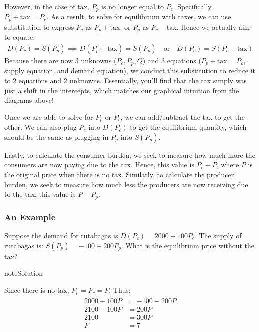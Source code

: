 \documentclass[letterpaper,10pt,english]{jupyterBook}
\begin{document}
\sphinxAtStartPar
However, in the case of tax, \(P_p\) is no longer equal to \(P_c\). Specifically, \(P_p+\text{tax}=P_c\). As a result, to solve for equilibrium with taxes, we can use substitution to express \(P_c\) as \(P_p+\text{tax}\), or \(P_p\) as \(P_c−\text{tax}\). Hence we actually aim to equate:
\begin{equation*}
\begin{split}D(P_c)=S(P_p)\implies D(P_p+\text{tax})=S(P_p)\quad \text{or} \quad D(P_c)=S(P_c−\text{tax})\end{split}
\end{equation*}
\sphinxAtStartPar
Because there are now 3 unknowns (\(P_c,P_p,Q\)) and 3 equations (\(P_p+\text{tax}=P_c\), supply equation, and demand equation), we conduct this substitution to reduce it to 2 equations and 2 unknowns. Essentially, you’ll find that the tax simply was just a shift in the intercepts, which matches our graphical intuition from the diagrams above!

\sphinxAtStartPar
Once we are able to solve for \(P_p\) or \(P_c\), we can add/subtract the tax to get the other. We can also plug \(P_c\) into \(D(P_c)\) to get the equilibrium quantity, which should be the same as plugging in \(P_p\) into \(S(P_p)\).

\sphinxAtStartPar
Lastly, to calculate the consumer burden, we seek to measure how much more the consumers are now paying due to the tax. Hence, this value is \(P_c−P\), where \(P\) is the original price when there is no tax. Similarly, to calculate the producer burden, we seek to measure how much less the producers are now receiving due to the tax; this value is \(P−P_p\).


\subsubsection{An Example}
\label{\detokenize{content/03-public/taxes-subsidies:an-example}}
\sphinxAtStartPar
{} Suppose the demand for rutabagas is \(D(P_c) = 2000 − 100P_c\). The supply of rutabagas is: \(S(P_p) = −100 + 200P_p\). What is the equilibrium price without the tax?

\begin{sphinxadmonition}{note}{Solution}

\sphinxAtStartPar
Since there is no tax, \(P_p = P_c = P\). Thus:
\begin{equation*}
\begin{split}
\begin{align*}
2000 - 100P &= -100 + 200 P \\
2100 - 100P &= 200 P \\
2100 &= 300 P \\
P &= 7 \\
\end{align*}
\end{split}
\end{equation*}\end{sphinxadmonition}
\end{document}

